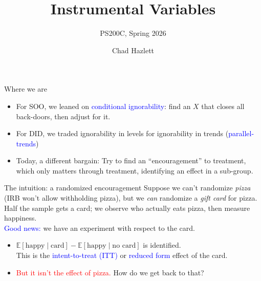 \documentclass[xcolor=dvipsnames]{beamer}
\title[]{Instrumental Variables}
\subtitle[ ]{PS200C, Spring 2026}
\author[Hazlett]{Chad Hazlett}
\institute[UCLA]{UCLA\\[1ex]
  \texttt{chazlett@ucla.edu}
}
\date{}
\newcommand\E{\mathbb{E}}
\begin{document}
\begin{frame}
  \titlepage
\end{frame}

\begin{frame}{Where we are}
\begin{itemize}
\item<1-> For SOO, we leaned on \textcolor{Blue}{conditional ignorability}: find an $X$ that closes all back-doors, then adjust for it.
\medskip
\item For DID, we traded ignorability in levels for ignorability in trends (\textcolor{Blue}{parallel-trends})
\medskip
\item Today, a different bargain: Try to find an ``encouragement'' to treatment, which only matters through treatment, identifying an effect in a sub-group.
\end{itemize}
\end{frame}

\begin{frame}{The intuition: a randomized encouragement}
 Suppose we can't randomize \textit{pizza} (IRB won't allow withholding pizza), but we \textit{can} randomize a \textit{gift card} for pizza.\\
\bigskip
{} Half the sample gets a card; we observe who actually eats pizza, then measure happiness.\\
\bigskip
{} \textcolor{Blue}{Good news:} we have an experiment with respect to the card.
\begin{itemize}
\item<4-> $\E[\text{happy} \mid \text{card}] - \E[\text{happy} \mid \text{no card}]$ is identified.\\
This is the \textcolor{Blue}{intent-to-treat (ITT)} or \textcolor{Blue}{reduced form} effect of the card.
\item<5-> \textcolor{Red}{But it isn't the effect of pizza.} How do we get back to that?
\end{itemize}
\end{frame}
\end{document}
